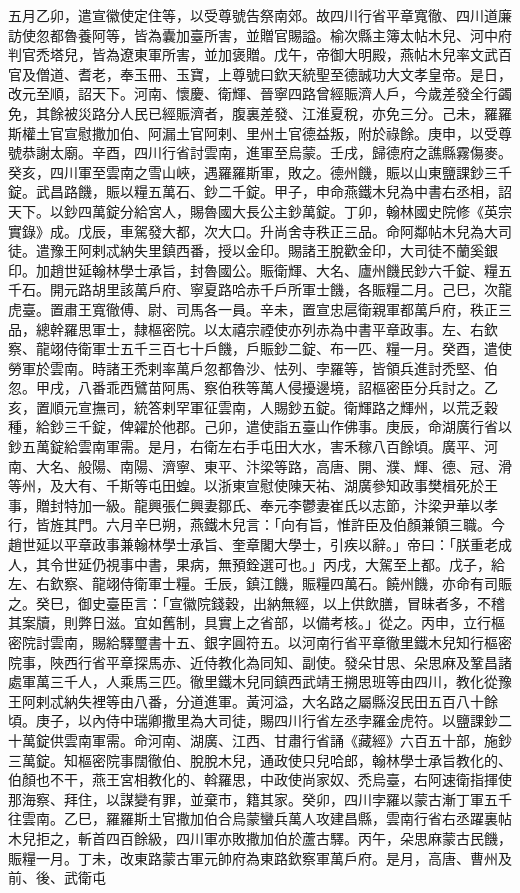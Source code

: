 \begin{pinyinscope}
 五月乙卯，遣宣徽使定住等，以受尊號告祭南郊。故四川行省平章寬徹、四川道廉訪使忽都魯養阿等，皆為囊加臺所害，並贈官賜謚。榆次縣主簿太帖木兒、河中府判官禿塔兒，皆為遼東軍所害，並加褒贈。戊午，帝御大明殿，燕帖木兒率文武百官及僧道、耆老，奉玉冊、玉寶，上尊號曰欽天統聖至德誠功大文孝皇帝。是日，改元至順，詔天下。河南、懷慶、衛輝、晉寧四路曾經賑濟人戶，今歲差發全行蠲免，其餘被災路分人民已經賑濟者，腹裏差發、江淮夏稅，亦免三分。己未，羅羅斯權土官宣慰撒加伯、阿漏土官阿剌、里州土官德益叛，附於祿餘。庚申，以受尊號恭謝太廟。辛酉，四川行省討雲南，進軍至烏蒙。壬戌，歸德府之譙縣霧傷麥。癸亥，四川軍至雲南之雪山峽，遇羅羅斯軍，敗之。德州饑，賑以山東鹽課鈔三千錠。武昌路饑，賑以糧五萬石、鈔二千錠。甲子，申命燕鐵木兒為中書右丞相，詔天下。以鈔四萬錠分給宮人，賜魯國大長公主鈔萬錠。丁卯，翰林國史院修《英宗實錄》成。戊辰，車駕發大都，次大口。升尚舍寺秩正三品。命阿鄰帖木兒為大司徒。遣豫王阿剌忒納失里鎮西番，授以金印。賜諸王脫歡金印，大司徒不蘭奚銀印。加趙世延翰林學士承旨，封魯國公。賑衛輝、大名、廬州饑民鈔六千錠、糧五千石。開元路胡里該萬戶府、寧夏路哈赤千戶所軍士饑，各賑糧二月。己巳，次龍虎臺。置肅王寬徹傅、尉、司馬各一員。辛未，置宣忠扈衛親軍都萬戶府，秩正三品，總幹羅思軍士，隸樞密院。以太禧宗禋使亦列赤為中書平章政事。左、右欽察、龍翊侍衛軍士五千三百七十戶饑，戶賑鈔二錠、布一匹、糧一月。癸酉，遣使勞軍於雲南。時諸王禿剌率萬戶忽都魯沙、怯列、孛羅等，皆領兵進討禿堅、伯忽。甲戌，八番乖西鷿苗阿馬、察伯秩等萬人侵擾邊境，詔樞密臣分兵討之。乙亥，置順元宣撫司，統答剌罕軍征雲南，人賜鈔五錠。衛輝路之輝州，以荒乏穀種，給鈔三千錠，俾糴於他郡。己卯，遣使詣五臺山作佛事。庚辰，命湖廣行省以鈔五萬錠給雲南軍需。是月，右衛左右手屯田大水，害禾稼八百餘頃。廣平、河南、大名、般陽、南陽、濟寧、東平、汴梁等路，高唐、開、濮、輝、德、冠、滑等州，及大有、千斯等屯田蝗。以浙東宣慰使陳天祐、湖廣參知政事樊楫死於王事，贈封特加一級。龍興張仁興妻鄒氏、奉元李鬱妻崔氏以志節，汴梁尹華以孝行，皆旌其門。六月辛巳朔，燕鐵木兒言：「向有旨，惟許臣及伯顏兼領三職。今趙世延以平章政事兼翰林學士承旨、奎章閣大學士，引疾以辭。」帝曰：「朕重老成人，其令世延仍視事中書，果病，無預銓選可也。」丙戌，大駕至上都。戊子，給左、右欽察、龍翊侍衛軍士糧。壬辰，鎮江饑，賑糧四萬石。饒州饑，亦命有司賑之。癸巳，御史臺臣言：「宣徽院錢穀，出納無經，以上供飲膳，冒昧者多，不稽其案牘，則弊日滋。宜如舊制，具實上之省部，以備考核。」從之。丙申，立行樞密院討雲南，賜給驛璽書十五、銀字圓符五。以河南行省平章徹里鐵木兒知行樞密院事，陜西行省平章探馬赤、近侍教化為同知、副使。發朵甘思、朵思麻及鞏昌諸處軍萬三千人，人乘馬三匹。徹里鐵木兒同鎮西武靖王搠思班等由四川，教化從豫王阿剌忒納失裡等由八番，分道進軍。黃河溢，大名路之屬縣沒民田五百八十餘頃。庚子，以內侍中瑞卿撒里為大司徒，賜四川行省左丞孛羅金虎符。以鹽課鈔二十萬錠供雲南軍需。命河南、湖廣、江西、甘肅行省誦《藏經》六百五十部，施鈔三萬錠。知樞密院事闊徹伯、脫脫木兒，通政使只兒哈郎，翰林學士承旨教化的、伯顏也不干，燕王宮相教化的、斡羅思，中政使尚家奴、禿烏臺，右阿速衛指揮使那海察、拜住，以謀變有罪，並棄市，籍其家。癸卯，四川孛羅以蒙古漸丁軍五千往雲南。乙巳，羅羅斯土官撒加伯合烏蒙蠻兵萬人攻建昌縣，雲南行省右丞躍裏帖木兒拒之，斬首四百餘級，四川軍亦敗撒加伯於蘆古驛。丙午，朵思麻蒙古民饑，賑糧一月。丁未，改東路蒙古軍元帥府為東路欽察軍萬戶府。是月，高唐、曹州及前、後、武衛屯
\end{pinyinscope}
